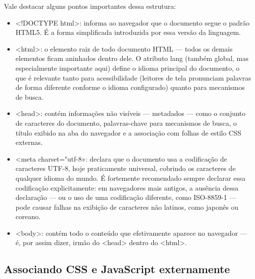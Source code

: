 Vale destacar alguns pontos importantes dessa estrutura:

\begin{itemize}
  \item <!DOCTYPE html>: informa ao navegador que o documento segue o padrão HTML5. É a forma simplificada introduzida por essa versão da linguagem.
\end{itemize}

\begin{itemize}
  \item <html>: o elemento raiz de todo documento HTML — todos os demais elementos ficam aninhados dentro dele. O atributo lang (também global, mas especialmente importante aqui) define o idioma principal do documento, o que é relevante tanto para acessibilidade (leitores de tela pronunciam palavras de forma diferente conforme o idioma configurado) quanto para mecanismos de busca.
\end{itemize}

\begin{itemize}
  \item <head>: contém informações não visíveis — metadados — como o conjunto de caracteres do documento, palavras-chave para mecanismos de busca, o título exibido na aba do navegador e a associação com folhas de estilo CSS externas.
\end{itemize}

\begin{itemize}
  \item <meta charset="utf-8»: declara que o documento usa a codificação de caracteres UTF-8, hoje praticamente universal, cobrindo os caracteres de qualquer idioma do mundo. É fortemente recomendado sempre declarar essa codificação explicitamente: em navegadores mais antigos, a ausência dessa declaração — ou o uso de uma codificação diferente, como ISO-8859-1 — pode causar falhas na exibição de caracteres não latinos, como japonês ou coreano.
\end{itemize}

\begin{itemize}
  \item <body>: contém todo o conteúdo que efetivamente aparece no navegador — é, por assim dizer, irmão do <head> dentro do <html>.
\end{itemize}

\subsection{Associando CSS e JavaScript externamente}

